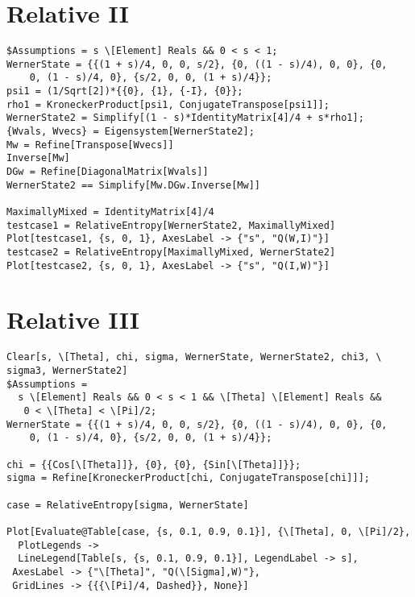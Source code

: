 \section{Relative II}
\begin{verbatim}
$Assumptions = s \[Element] Reals && 0 < s < 1;
WernerState = {{(1 + s)/4, 0, 0, s/2}, {0, ((1 - s)/4), 0, 0}, {0, 
    0, (1 - s)/4, 0}, {s/2, 0, 0, (1 + s)/4}};
psi1 = (1/Sqrt[2])*{{0}, {1}, {-I}, {0}};
rho1 = KroneckerProduct[psi1, ConjugateTranspose[psi1]];
WernerState2 = Simplify[(1 - s)*IdentityMatrix[4]/4 + s*rho1];
{Wvals, Wvecs} = Eigensystem[WernerState2];
Mw = Refine[Transpose[Wvecs]]
Inverse[Mw]
DGw = Refine[DiagonalMatrix[Wvals]]
WernerState2 == Simplify[Mw.DGw.Inverse[Mw]]

MaximallyMixed = IdentityMatrix[4]/4
testcase1 = RelativeEntropy[WernerState2, MaximallyMixed]
Plot[testcase1, {s, 0, 1}, AxesLabel -> {"s", "Q(W,I)"}]
testcase2 = RelativeEntropy[MaximallyMixed, WernerState2]
Plot[testcase2, {s, 0, 1}, AxesLabel -> {"s", "Q(I,W)"}]
\end{verbatim}
\section{Relative III}
\begin{verbatim}
Clear[s, \[Theta], chi, sigma, WernerState, WernerState2, chi3, \
sigma3, WernerState2]
$Assumptions = 
  s \[Element] Reals && 0 < s < 1 && \[Theta] \[Element] Reals && 
   0 < \[Theta] < \[Pi]/2;
WernerState = {{(1 + s)/4, 0, 0, s/2}, {0, ((1 - s)/4), 0, 0}, {0, 
    0, (1 - s)/4, 0}, {s/2, 0, 0, (1 + s)/4}};

chi = {{Cos[\[Theta]]}, {0}, {0}, {Sin[\[Theta]]}};
sigma = Refine[KroneckerProduct[chi, ConjugateTranspose[chi]]];

case = RelativeEntropy[sigma, WernerState]

Plot[Evaluate@Table[case, {s, 0.1, 0.9, 0.1}], {\[Theta], 0, \[Pi]/2},
  PlotLegends -> 
  LineLegend[Table[s, {s, 0.1, 0.9, 0.1}], LegendLabel -> s], 
 AxesLabel -> {"\[Theta]", "Q(\[Sigma],W)"}, 
 GridLines -> {{{\[Pi]/4, Dashed}}, None}]
\end{verbatim}